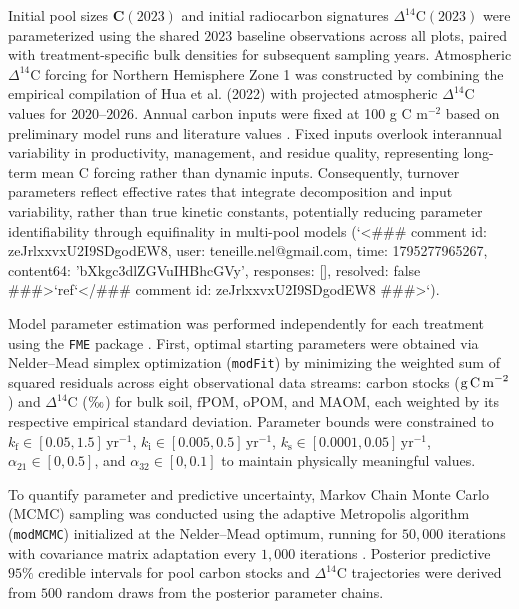 \documentclass[preprint,12pt]{elsarticle}
\begin{document}
Initial pool sizes $\mathbf{C}(2023)$ and initial radiocarbon signatures $\Delta^{14}\text{C}(2023)$ were parameterized using the shared $2023$ baseline observations across all plots, paired with treatment-specific bulk densities for subsequent sampling years. Atmospheric $\Delta^{14}\text{C}$ forcing for Northern Hemisphere Zone 1 was constructed by combining the empirical compilation of Hua et al. (2022) \citep{Hua2022} with projected atmospheric $\Delta^{14}\text{C}$ values for $2020\text{--}2026$. Annual carbon inputs were fixed at 100 g C m$^{-2}$ based on preliminary model runs and literature values \citep{Ven2020}. Fixed inputs overlook interannual variability in productivity, management, and residue quality, representing long-term mean C forcing rather than dynamic inputs. Consequently, turnover parameters reflect effective rates that integrate decomposition and input variability, rather than true kinetic constants, potentially reducing parameter identifiability through equifinality in multi-pool models (`<### comment id: zeJrlxxvxU2I9SDgodEW8, user: teneille.nel@gmail.com, time: 1795277965267, content64: 'bXkgc3dlZGVuIHBhcGVy', responses: [], resolved: false ###>`ref`</### comment id: zeJrlxxvxU2I9SDgodEW8 ###>`).

Model parameter estimation was performed independently for each treatment using the \texttt{FME} package \citep{Soetaert2010}. First, optimal starting parameters were obtained via Nelder--Mead simplex optimization (\texttt{modFit}) by minimizing the weighted sum of squared residuals across eight observational data streams: carbon stocks ($\text{g\,C\,m}^{-2}$) and $\Delta^{14}\text{C}$ ($\text{\textperthousand}$) for bulk soil, $\text{fPOM}$, $\text{oPOM}$, and $\text{MAOM}$, each weighted by its respective empirical standard deviation. Parameter bounds were constrained to $k_{\text{f}} \in [0.05, 1.5]\,\text{yr}^{-1}$, $k_{\text{i}} \in [0.005, 0.5]\,\text{yr}^{-1}$, $k_{\text{s}} \in [0.0001, 0.05]\,\text{yr}^{-1}$, $\alpha_{21} \in [0, 0.5]$, and $\alpha_{32} \in [0, 0.1]$ to maintain physically meaningful values.

To quantify parameter and predictive uncertainty, Markov Chain Monte Carlo (MCMC) sampling was conducted using the adaptive Metropolis algorithm (\texttt{modMCMC}) initialized at the Nelder--Mead optimum, running for $50{,}000$ iterations with covariance matrix adaptation every $1{,}000$ iterations \citep{Soetaert2010}. Posterior predictive $95\%$ credible intervals for pool carbon stocks and $\Delta^{14}\text{C}$ trajectories were derived from $500$ random draws from the posterior parameter chains.
\end{document}
